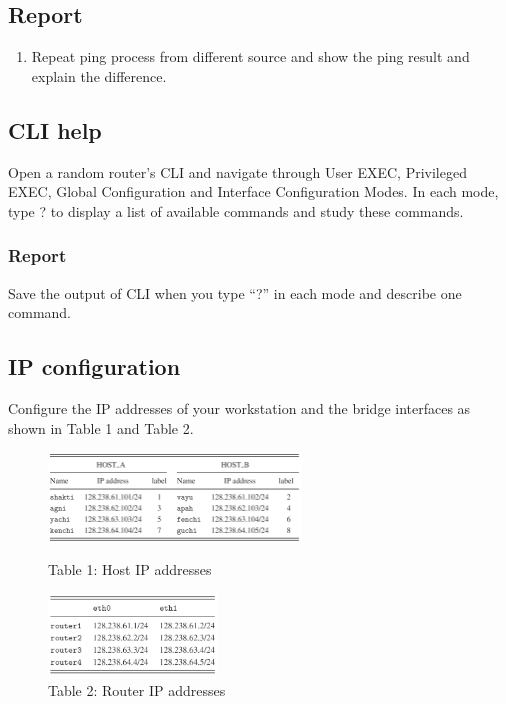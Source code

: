 \documentclass[10pt,a4paper]{article}
\numberwithin{equation}{section}
\numberwithin{figure}{section}
\numberwithin{table}{section}
\begin{document}
    \subsection*{Report}
    \begin{enumerate}
        \item Repeat ping process from different source and show the ping result and explain the difference.

    \end{enumerate}
    
\subsection{CLI help}
    Open a random router’s CLI and navigate through User EXEC, Privileged EXEC, Global Configuration and Interface Configuration Modes. In each mode, type ? to display a list of available commands and study these commands.

\subsubsection*{Report}
 Save the output of CLI when you type “?” in each mode and describe one command.
    

\subsection{IP configuration}
    Configure the IP addresses of your workstation and the bridge interfaces as shown in Table 1 and Table 2.\\

    \begin{figure}[H]
        \centering
        \includegraphics[width=0.6\textwidth]{img/table1.png}
        \caption{Table 1: Host IP addresses}
        \label{tbl:table1}
        \includegraphics[width=0.4\textwidth]{img/table2.png}
        \caption{Table 2: Router IP addresses}
        \label{tbl:table2}
    \end{figure}
\end{document}
